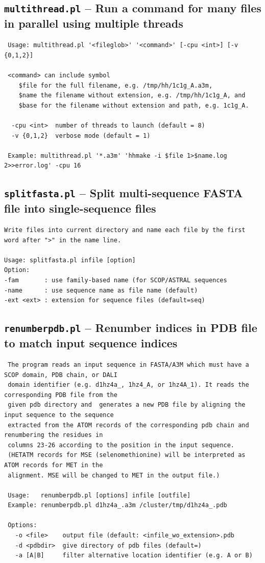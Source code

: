 \documentclass[11pt,a4paper]{article}
\begin{document}
\subsection{{\tt multithread.pl} -- Run a command for many files in parallel using multiple threads}

\small 
\begin{verbatim}
 Usage: multithread.pl '<fileglob>' '<command>' [-cpu <int>] [-v {0,1,2}]

 <command> can include symbol 
    $file for the full filename, e.g. /tmp/hh/1c1g_A.a3m, 
    $name the filename without extension, e.g. /tmp/hh/1c1g_A, and 
    $base for the filename without extension and path, e.g. 1c1g_A.

  -cpu <int>  number of threads to launch (default = 8)
  -v {0,1,2}  verbose mode (default = 1)

 Example: multithread.pl '*.a3m' 'hhmake -i $file 1>$name.log 2>>error.log' -cpu 16
\end{verbatim} 
\normalsize

\subsection{{\tt splitfasta.pl} -- Split multi-sequence FASTA file into single-sequence files}
\small 
\begin{verbatim}
Write files into current directory and name each file by the first word after ">" in the name line. 

Usage: splitfasta.pl infile [option]
Option:
-fam       : use family-based name (for SCOP/ASTRAL sequences
-name      : use sequence name as file name (default)
-ext <ext> : extension for sequence files (default=seq)
\end{verbatim} 
\normalsize

\subsection{{\tt renumberpdb.pl} -- Renumber indices in PDB file to match input sequence indices}

\small 
\begin{verbatim}
 The program reads an input sequence in FASTA/A3M which must have a SCOP domain, PDB chain, or DALI 
 domain identifier (e.g. d1hz4a_, 1hz4_A, or 1hz4A_1). It reads the corresponding PDB file from the 
 given pdb directory and  generates a new PDB file by aligning the input sequence to the sequence 
 extracted from the ATOM records of the corresponding pdb chain and renumbering the residues in 
 columns 23-26 according to the position in the input sequence.
 (HETATM records for MSE (selenomethionine) will be interpreted as ATOM records for MET in the 
 alignment. MSE will be changed to MET in the output file.)
 
 Usage:   renumberpdb.pl [options] infile [outfile] 
 Example: renumberpdb.pl d1hz4a_.a3m /cluster/tmp/d1hz4a_.pdb 

 Options: 
   -o <file>    output file (default: <infile_wo_extension>.pdb
   -d <pdbdir>  give directory of pdb files (default=)
   -a [A|B]     filter alternative location identifier (e.g. A or B)
\end{verbatim} 
\normalsize
\end{document}
